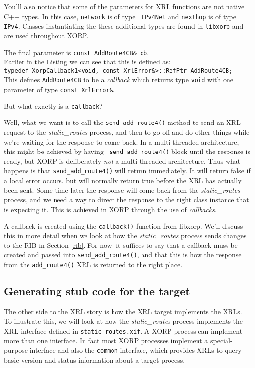 \documentclass[11pt]{article}
\newcommand{\stt}{\tt\small}
\newcommand{\SRI}{{\it static\_routes}\xspace}
\begin{document}
You'll also notice that some of the parameters for XRL functions are
not native C++ types.  In this case, {\stt network} is of type {\stt
IPv4Net} and {\stt nexthop} is of type {\stt IPv4}.  Classes
instantiating the these additional types are found in {\stt libxorp}
and are used throughout XORP.  

The final parameter is {\stt const AddRoute4CB\& cb}.\\
Earlier in the
Listing we can see that this is defined as:\\
{\stt typedef XorpCallback1<void, const XrlError\&>::RefPtr
  AddRoute4CB;}\\
This defines {\stt AddRoute4CB} to be a {\it callback} which returns type
{\stt void} with one parameter of type {\stt const XrlError\&}.

But what exactly is a {\stt callback}?

Well, what we want is to call the {\stt send\_add\_route4()} method to
send an XRL request to the \SRI process, and then to go off and do
other things while we're waiting for the response to come back.  In a
multi-threaded architecture, this might be achieved by having {\stt
send\_add\_route4()} block until the response is ready, but XORP is
deliberately {\it not} a multi-threaded architecture. Thus what
happens is that {\stt send\_add\_route4()} will return immediately.
It will return false if a local error occurs, but will normally return
true before the XRL has actually been sent.  Some time later the
response will come back from the \SRI process, and we need a way to
direct the response to the right class instance that is expecting it.
This is achieved in XORP through the use of {\it callbacks}.

A callback is created using the {\stt callback()} function from
libxorp.  We'll discuss this in more detail when we look at how the
\SRI process sends changes to the RIB in Section \ref{rib}.  For now,
it suffices to say that a callback must be created and passed into
{\stt send\_add\_route4()}, and that this is how the response from the
{\stt add\_route4()} XRL is returned to the right place.

\newpage
\subsection{Generating stub code for the target}

The other side to the XRL story is how the XRL target implements the
XRLs.  To illustrate this, we will look at how the \SRI process
implements the XRL interface defined in {\stt static\_routes.xif}.
A XORP process can implement more than one interface.  In fact most
XORP processes implement a special-purpose interface and also the
{\stt common} interface, which provides XRLs to query basic version
and status information about a target process.
\end{document}

